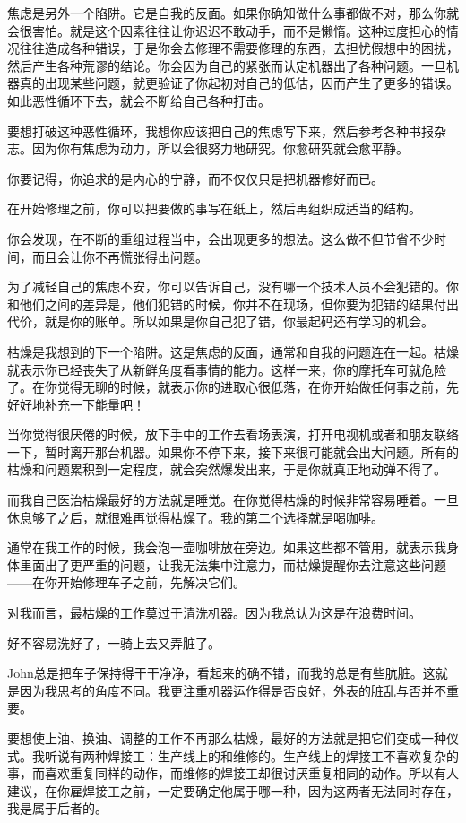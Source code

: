 \documentclass[UTF8]{article}
\begin{document}
\par 焦虑是另外一个陷阱。它是自我的反面。如果你确知做什么事都做不对，那么你就会很害怕。就是这个因素往往让你迟迟不敢动手，而不是懒惰。这种过度担心的情况往往造成各种错误，于是你会去修理不需要修理的东西，去担忧假想中的困扰，然后产生各种荒谬的结论。你会因为自己的紧张而认定机器出了各种问题。一旦机器真的出现某些问题，就更验证了你起初对自己的低估，因而产生了更多的错误。如此恶性循环下去，就会不断给自己各种打击。
\par 要想打破这种恶性循环，我想你应该把自己的焦虑写下来，然后参考各种书报杂志。因为你有焦虑为动力，所以会很努力地研究。你愈研究就会愈平静。
\par 你要记得，你追求的是内心的宁静，而不仅仅只是把机器修好而已。
\par 在开始修理之前，你可以把要做的事写在纸上，然后再组织成适当的结构。
\par 你会发现，在不断的重组过程当中，会出现更多的想法。这么做不但节省不少时间，而且会让你不再慌张得出问题。
\par 为了减轻自己的焦虑不安，你可以告诉自己，没有哪一个技术人员不会犯错的。你和他们之间的差异是，他们犯错的时候，你并不在现场，但你要为犯错的结果付出代价，就是你的账单。所以如果是你自己犯了错，你最起码还有学习的机会。
\par 枯燥是我想到的下一个陷阱。这是焦虑的反面，通常和自我的问题连在一起。枯燥就表示你已经丧失了从新鲜角度看事情的能力。这样一来，你的摩托车可就危险了。在你觉得无聊的时候，就表示你的进取心很低落，在你开始做任何事之前，先好好地补充一下能量吧！
\par 当你觉得很厌倦的时候，放下手中的工作去看场表演，打开电视机或者和朋友联络一下，暂时离开那台机器。如果你不停下来，接下来很可能就会出大问题。所有的枯燥和问题累积到一定程度，就会突然爆发出来，于是你就真正地动弹不得了。
\par 而我自己医治枯燥最好的方法就是睡觉。在你觉得枯燥的时候非常容易睡着。一旦休息够了之后，就很难再觉得枯燥了。我的第二个选择就是喝咖啡。
\par 通常在我工作的时候，我会泡一壶咖啡放在旁边。如果这些都不管用，就表示我身体里面出了更严重的问题，让我无法集中注意力，而枯燥提醒你去注意这些问题——在你开始修理车子之前，先解决它们。
\par 对我而言，最枯燥的工作莫过于清洗机器。因为我总认为这是在浪费时间。
\par 好不容易洗好了，一骑上去又弄脏了。
\par John总是把车子保持得干干净净，看起来的确不错，而我的总是有些肮脏。这就是因为我思考的角度不同。我更注重机器运作得是否良好，外表的脏乱与否并不重要。
\par 要想使上油、换油、调整的工作不再那么枯燥，最好的方法就是把它们变成一种仪式。我听说有两种焊接工：生产线上的和维修的。生产线上的焊接工不喜欢复杂的事，而喜欢重复同样的动作，而维修的焊接工却很讨厌重复相同的动作。所以有人建议，在你雇焊接工之前，一定要确定他属于哪一种，因为这两者无法同时存在，我是属于后者的。
\end{document}
